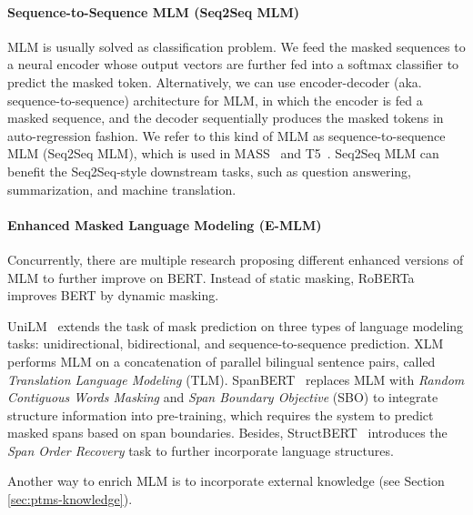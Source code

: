 \documentclass[fleqn]{SCYE-arxiv}
\begin{document}
\begin{multicols}{2}
\paragraph{Sequence-to-Sequence MLM (Seq2Seq MLM)}
MLM is usually solved as classification problem.
We feed the masked sequences to a neural encoder whose output vectors are further fed into a softmax classifier to predict the masked token.
Alternatively, we can use encoder-decoder (aka. sequence-to-sequence) architecture for MLM, in which the encoder is fed a masked sequence, and the decoder sequentially produces the masked tokens in auto-regression fashion.
We refer to this kind of MLM as sequence-to-sequence MLM (Seq2Seq MLM), which is used in MASS~\cite{DBLP:conf/icml/SongTQLL19} and T5~\cite{raffel2019t5}. Seq2Seq MLM can benefit the Seq2Seq-style downstream tasks, such as question answering, summarization, and machine translation.


\paragraph{Enhanced Masked Language Modeling (E-MLM)}
Concurrently, there are multiple research proposing different enhanced versions of MLM to further improve on BERT.
Instead of static masking, RoBERTa~\cite{liu2019roberta} improves BERT by dynamic masking.

UniLM~\cite{DBLP:conf/nips/00040WWLWGZH19,bao2020unilmv2} extends the task of mask prediction on three types of language modeling tasks: unidirectional, bidirectional, and sequence-to-sequence prediction.
XLM~\cite{DBLP:conf/nips/ConneauL19} performs MLM on a concatenation of parallel bilingual sentence pairs, called \textit{Translation Language Modeling} (TLM).
SpanBERT~\cite{joshi2019spanbert} replaces MLM with \textit{Random Contiguous Words Masking} and \textit{Span Boundary Objective} (SBO) to integrate structure information into pre-training, which requires the system to predict masked spans based on span boundaries. Besides, StructBERT~\cite{wang2020structbert} introduces the \textit{Span Order Recovery} task to further incorporate language structures.


Another way to enrich MLM is to incorporate external knowledge (see Section \ref{sec:ptms-knowledge}).


\end{multicols}
\end{document}
